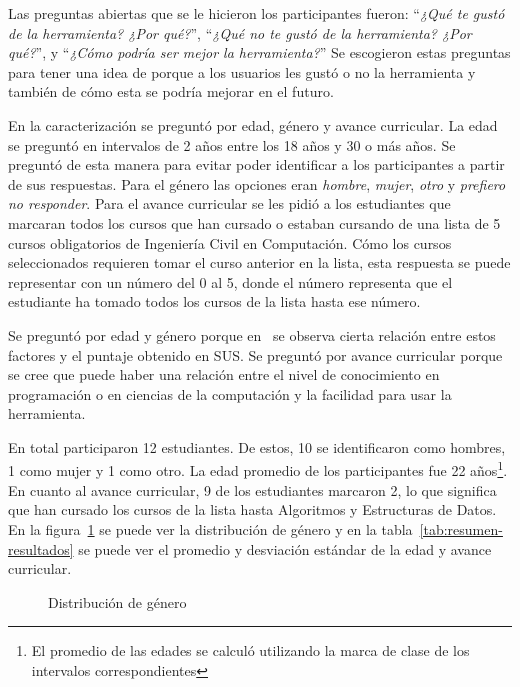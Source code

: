Las preguntas abiertas que se le hicieron los participantes fueron: ``\textit{¿Qué te gustó de la herramienta? ¿Por qué?}'', ``\textit{¿Qué no te gustó de la herramienta? ¿Por qué?}'', y ``\textit{¿Cómo podría ser mejor la herramienta?}'' Se escogieron estas preguntas para tener una idea de porque a los usuarios les gustó o no la herramienta y también de cómo esta se podría mejorar en el futuro.

En la caracterización se preguntó por edad, género y avance curricular. La edad se preguntó en intervalos de 2 años entre los 18 años y 30 o más años. Se preguntó de esta manera para evitar poder identificar a los participantes a partir de sus respuestas. Para el género las opciones eran \textit{hombre}, \textit{mujer}, \textit{otro} y \textit{prefiero no responder}. Para el avance curricular se les pidió a los estudiantes que marcaran todos los cursos que han cursado o estaban cursando de una lista de 5 cursos obligatorios de Ingeniería Civil en Computación. Cómo los cursos seleccionados requieren tomar el curso anterior en la lista, esta respuesta se puede representar con un número del 0 al 5, donde el número representa que el estudiante ha tomado todos los cursos de la lista hasta ese número.

Se preguntó por edad y género porque en~\cite{evaluation-of-sus} se observa cierta relación entre estos factores y el puntaje obtenido en SUS. Se preguntó por avance curricular porque se cree que puede haber una relación entre el nivel de conocimiento en programación o en ciencias de la computación y la facilidad para usar la herramienta.

En total participaron 12 estudiantes. De estos, 10 se identificaron como hombres, 1 como mujer y 1 como otro. La edad promedio de los participantes fue 22 años\footnote{El promedio de las edades se calculó utilizando la marca de clase de los intervalos correspondientes}. En cuanto al avance curricular, 9 de los estudiantes marcaron 2, lo que significa que han cursado los cursos de la lista hasta Algoritmos y Estructuras de Datos. En la figura~\ref{fig:genero} se puede ver la distribución de género y en la tabla~\ref{tab:resumen-resultados} se puede ver el promedio y desviación estándar de la edad y avance curricular.

\begin{figure}[hbt]
    \centering
    \caption{Distribución de género}
    \label{fig:genero}
\end{figure}

